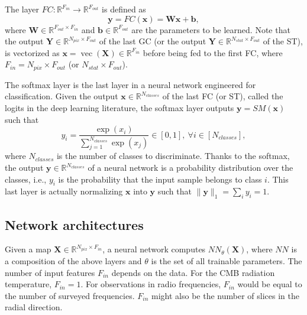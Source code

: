 \documentclass[final,twocolumn,3p,times,sort&compress]{elsarticle}
\renewcommand{\b}[1]{{\bm{#1}}}   %
\newcommand{\1}{\b{1}}              %
\newcommand{\0}{\b{0}}              %
\newcommand{\W}{\b{W}}
\newcommand{\x}{\b{x}}
\newcommand{\X}{\b{X}}
\newcommand{\y}{\b{y}}
\newcommand{\Y}{\b{Y}}
\newcommand{\R}{\mathbb{R}}
\DeclareMathOperator*{\vect}{vec}
\begin{document}
The layer $FC: \R^{F_{in}} \rightarrow \R^{F_{out}}$ is defined as
\begin{equation} \label{eqn:fc_layer}
	\y = FC(\x) = \b W \x + \b b ,
\end{equation}
where $\W \in \R^{F_{out} \times F_{in}}$ and $\b b \in \R^{F_{out}}$ are the parameters to be learned.
Note that the output $\Y \in \R^{N_{pix} \times F_{out}}$ of the last GC (or the output $\Y \in \R^{N_{stat} \times F_{out}}$ of the ST), is vectorized as $\x = \vect(\X) \in \R^{F_{in}}$ before being fed to the first FC, where $F_{in} = N_{pix} \times F_{out}$ (or $N_{stat} \times F_{out}$).

The softmax layer is the last layer in a neural network engineered for classification. Given the output $\x \in \R^{N_{classes}}$ of the last FC (or ST), called the logits in the deep learning literature, the softmax layer outputs $\y = SM(\x)$ such that
\begin{equation*}
	y_i = \frac{\exp(x_i)}{\sum_{j=1}^{N_{classes}} \exp(x_j)} \in [0, 1], \ \forall i \in [N_{classes}],
\end{equation*}
where $N_{classes}$ is the number of classes to discriminate. Thanks to the softmax, the output $\y \in \R^{N_{classes}}$ of a neural network is a probability distribution over the classes, i.e., $y_i$ is the probability that the input sample belongs to class $i$. This last layer is actually normalizing $\x$ into $\y$ such that $\| \y \|_1 = \sum_i y_i = 1$.

\subsection{Network architectures}
\label{sec:architecture}

Given a map $\X \in \R^{N_{pix} \times F_{in}}$, a neural network computes $NN_\theta(\X)$, where $NN$ is a composition of the above layers and $\theta$ is the set of all trainable parameters.
The number of input features $F_{in}$ depends on the data. For the CMB radiation temperature, $F_{in} = 1$. For observations in radio frequencies, $F_{in}$ would be equal to the number of surveyed frequencies. $F_{in}$ might also be the number of slices in the radial direction.
\end{document}
